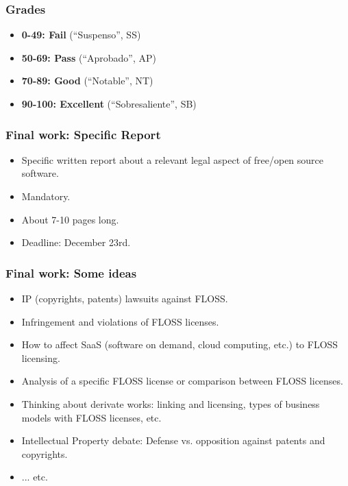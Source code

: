 
\begin{frame}
\frametitle{Grades}

\begin{itemize}
\item \textbf{0-49: Fail} (``Suspenso'', SS)
\item \textbf{50-69: Pass} (``Aprobado'', AP)
\item \textbf{70-89: Good} (``Notable'', NT)
\item \textbf{90-100: Excellent} (``Sobresaliente'', SB)
\end{itemize}

\end{frame}



\begin{frame}
\frametitle{Final work: Specific Report}

\begin{itemize}
\item Specific written report about a relevant legal aspect of free/open source software. 
\item Mandatory.
\item About 7-10 pages long.
\item Deadline: December 23rd.
\end{itemize}

\end{frame}


\begin{frame}
\frametitle{Final work: Some ideas}

\begin{itemize}
\item IP (copyrights, patents) lawsuits against FLOSS.
\item Infringement and violations of FLOSS licenses.
\item How to affect SaaS (software on demand, cloud computing, etc.) to FLOSS licensing.
\item Analysis of a specific FLOSS license or comparison between FLOSS licenses.
\item Thinking about derivate works: linking and licensing, types of business models with FLOSS licenses, etc.
\item Intellectual Property debate: Defense vs. opposition against pat­ents and copyrights. 
\item ... etc.
\end{itemize}

\end{frame}


